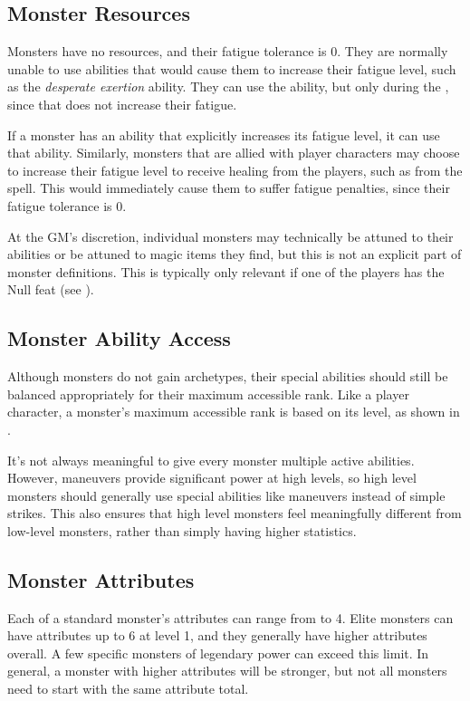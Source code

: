   \subsection{Monster Resources}
    Monsters have no resources, and their fatigue tolerance is 0.
    They are normally unable to use abilities that would cause them to increase their fatigue level, such as the \textit{desperate exertion} ability.
    They can use the  ability, but only during the , since that does not increase their fatigue.

    If a monster has an ability that explicitly increases its fatigue level, it can use that ability.
    Similarly, monsters that are allied with player characters may choose to increase their fatigue level to receive healing from the players, such as from the  spell.
    This would immediately cause them to suffer fatigue penalties, since their fatigue tolerance is 0.

    At the GM's discretion, individual monsters may technically be attuned to their abilities or be attuned to magic items they find, but this is not an explicit part of monster definitions.
    This is typically only relevant if one of the players has the Null feat (see ).

  \subsection{Monster Ability Access}\label{Monster Ability Access}
    Although monsters do not gain archetypes, their special abilities should still be balanced appropriately for their maximum accessible rank.
    Like a player character, a monster's maximum accessible rank is based on its level, as shown in .

    It's not always meaningful to give every monster multiple active abilities.
    However, maneuvers provide significant power at high levels, so high level monsters should generally use special abilities like maneuvers instead of simple strikes.
    This also ensures that high level monsters feel meaningfully different from low-level monsters, rather than simply having higher statistics.

  \subsection{Monster Attributes}\label{Monster Attributes}
    Each of a standard monster's attributes can range from  to 4.
    Elite monsters can have attributes up to 6 at level 1, and they generally have higher attributes overall.
    A few specific monsters of legendary power can exceed this limit.
    In general, a monster with higher attributes will be stronger, but not all monsters need to start with the same attribute total.

